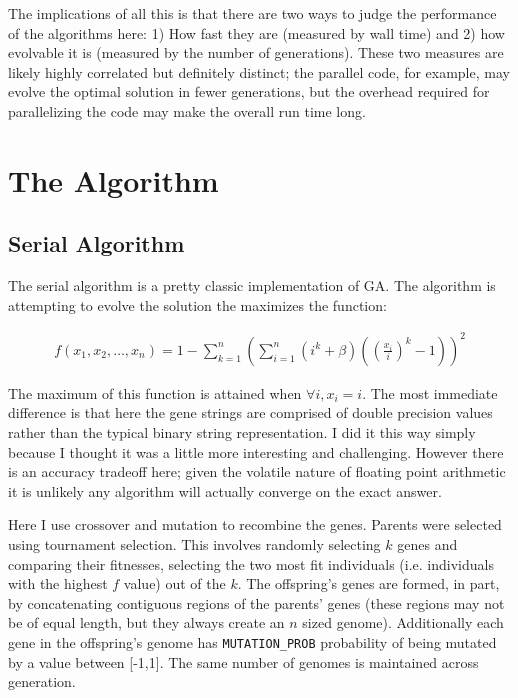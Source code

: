 \documentclass[11pt]{article}
\begin{document}
The implications of all this is that there are two ways to judge the performance of the algorithms here: 1) How fast they are (measured by wall time) and 2) how evolvable it is (measured by the number of generations). These two measures are likely highly correlated but definitely distinct; the parallel code, for example, may evolve the optimal solution in fewer generations, but the overhead required for parallelizing the code may make the overall run time long.

\section{The Algorithm}
\label{sec:orgb5457d2}

\subsection{Serial Algorithm}
\label{sec:org9337574}

The serial algorithm is a pretty classic implementation of GA. The algorithm is attempting to evolve the solution the maximizes the function:

\begin{equation*}
\begin{aligned}
f(x_{1},x_{2},\ldots,x_{n}) = 1 - \sum_{k = 1}^{n}\left(\sum_{i = 1}^{n}(i^{k} + \beta)\left((\frac{x_{i}}{i})^{k} -1\right)\right)^{2}

\end{aligned}
\end{equation*}

The maximum of this function is attained when \(\forall i, x_{i} = i\). The most immediate difference is that here the gene strings are comprised of double precision values rather than the typical binary string representation. I did it this way simply because I thought it was a little more interesting and challenging. However there is an accuracy tradeoff here; given the volatile nature of floating point arithmetic it is unlikely any algorithm will actually converge on the exact answer. 

Here I use crossover and mutation to recombine the genes. Parents were selected using tournament selection. This involves randomly selecting \(k\) genes and comparing their fitnesses, selecting the two most fit individuals (i.e. individuals with the highest \(f\) value) out of the \(k\). The offspring's genes are formed, in part, by concatenating contiguous regions of the parents' genes (these regions may not be of equal length, but they always create an \(n\) sized genome). Additionally each gene in the offspring's genome has \texttt{MUTATION\_PROB} probability of being mutated by a value between [-1,1]. The same number of genomes is maintained across generation.
\end{document}
